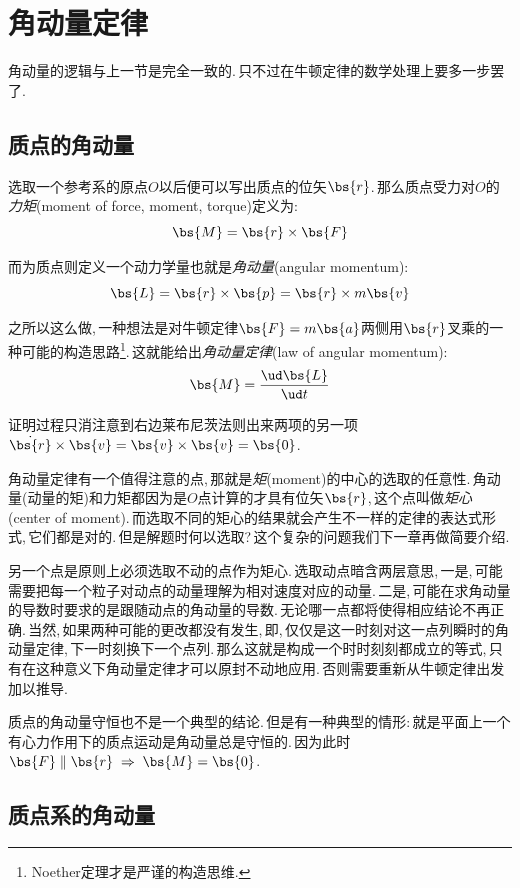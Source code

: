 \section{角动量定律}

角动量的逻辑与上一节是完全一致的.\,只不过在牛顿定律的数学处理上要多一步罢了.

\subsection{质点的角动量}
选取一个参考系的原点$O$以后便可以写出质点的位矢$\bs{r}$.\,那么质点受力对$O$的\emph{力矩}(moment of force,  moment, torque)定义为:
\[\bs{M}=\bs{r}\times\bs{F}\]

而为质点则定义一个动力学量也就是\emph{角动量}(angular momentum):
\[\bs{L}=\bs{r}\times \bs{p}=\bs{r}\times m\bs{v}\]

之所以这么做,\,一种想法是对牛顿定律$\bs{F}=m\bs{a}$两侧用$\bs{r}$叉乘的一种可能的构造思路\footnote{Noether定理才是严谨的构造思维.}.\,这就能给出\emph{角动量定律}(law of angular momentum):
\[\bs{M}=\frac{\ud \bs{L}}{\ud t}\]

证明过程只消注意到右边莱布尼茨法则出来两项的另一项$\dot{\bs{r}}\times\bs{v}=\bs{v}\times\bs{v}=\bs{0}$.

角动量定律有一个值得注意的点,\,那就是\emph{矩}(moment)的中心的选取的任意性.\,角动量(动量的矩)和力矩都因为是$O$点计算的才具有位矢$\bs{r}$,\,这个点叫做\emph{矩心}(center of moment).\,而选取不同的矩心的结果就会产生不一样的定律的表达式形式,\,它们都是对的.\,但是解题时何以选取?\,这个复杂的问题我们下一章再做简要介绍.

另一个点是原则上必须选取不动的点作为矩心.\,选取动点暗含两层意思,\,一是,\,可能需要把每一个粒子对动点的动量理解为相对速度对应的动量.\,二是,\,可能在求角动量的导数时要求的是跟随动点的角动量的导数.\,无论哪一点都将使得相应结论不再正确.\,当然,\,如果两种可能的更改都没有发生,\,即,\,仅仅是这一时刻对这一点列瞬时的角动量定律,\,下一时刻换下一个点列.\,那么这就是构成一个时时刻刻都成立的等式,\,只有在这种意义下角动量定律才可以原封不动地应用.\,否则需要重新从牛顿定律出发加以推导.

质点的角动量守恒也不是一个典型的结论.\,但是有一种典型的情形:\,就是平面上一个有心力作用下的质点运动是角动量总是守恒的.\,因为此时$\bs{F}\parallel \bs{r}\;\Rightarrow\;\bs{M}=\bs{0}$.

\subsection{质点系的角动量}

